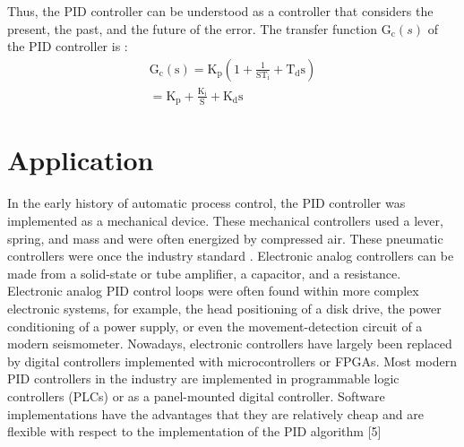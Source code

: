 Thus, the PID controller can be understood as a controller that considers the present, the past, and the future of the error. The transfer function $\mathrm{G}_{\mathrm{c}}(s)$ of the PID controller is :
$$
\begin{gathered}
\mathrm{G}_{\mathrm{c}}(\mathrm{s})=\mathrm{K}_{\mathrm{p}}\left(1+\frac{1}{\mathrm{ST}_{\mathrm{i}}}+\mathrm{T}_{\mathrm{d}} \mathrm{s}\right) \\
=\mathrm{K}_{\mathrm{p}}+\frac{\mathrm{K}_{\mathrm{i}}}{\mathrm{S}}+\mathrm{K}_{\mathrm{d}} \mathrm{s}
\end{gathered}
$$

\section{Application}	

In the early history of automatic process control, the PID controller was implemented as a mechanical device. These mechanical controllers used a lever, spring, and mass and were often energized by compressed air. These pneumatic controllers were once the industry standard .  Electronic analog controllers can be made from a solid-state or tube amplifier, a capacitor, and a resistance. Electronic analog PID control loops were often found within more complex electronic systems, for example, the head positioning of a disk drive, the power conditioning of a power supply, or even the movement-detection circuit of a modern seismometer. Nowadays, electronic controllers have largely been replaced by digital controllers implemented with microcontrollers or FPGAs.  Most modern PID controllers in the industry are implemented in programmable logic controllers (PLCs) or as a panel-mounted digital controller. Software implementations have the advantages that they are relatively cheap and are flexible with respect to the implementation of the PID algorithm [5]

\setcounter{equation}{0}
\setcounter{table}{0}
\setcounter{figure}{0}


 



